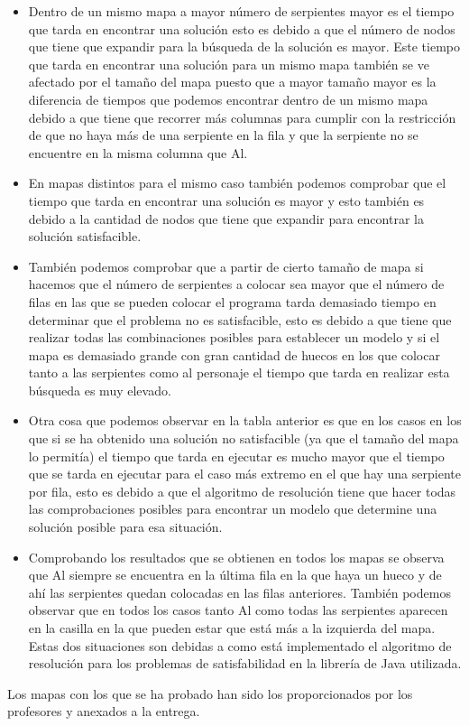 \documentclass[11pt,spanish]{article}
\begin{document}
			\begin{itemize}
				\item Dentro de un mismo mapa a mayor número de serpientes mayor es el tiempo que tarda en encontrar una solución esto es debido a que el número de nodos que tiene que expandir para la búsqueda de la solución es mayor. Este tiempo que tarda en encontrar una solución para un mismo mapa también se ve afectado por el tamaño del mapa puesto que a mayor tamaño mayor es la diferencia de tiempos que podemos encontrar dentro de un mismo mapa debido a que tiene que recorrer más columnas para cumplir con la restricción de que no haya más de una serpiente en la fila y que la serpiente no se encuentre en la misma columna que Al.
				\item En mapas distintos para el mismo caso también podemos comprobar que el tiempo que tarda en encontrar una solución es mayor y esto también es debido a la cantidad de nodos que tiene que expandir para encontrar la solución satisfacible.
				\item También podemos comprobar que a partir de cierto tamaño de mapa si hacemos que el número de serpientes a colocar sea mayor que el número de filas en las que se pueden colocar el programa tarda demasiado tiempo en determinar que el problema no es satisfacible, esto es debido a que tiene que realizar todas las combinaciones posibles para establecer un modelo y si el mapa es demasiado grande con gran cantidad de huecos en los que colocar tanto a las serpientes como al personaje el tiempo que tarda en realizar esta búsqueda es muy elevado.
				\item Otra cosa que podemos observar en la tabla anterior es que en los casos en los que si se ha obtenido una solución no satisfacible (ya que el tamaño del mapa lo permitía) el tiempo que tarda en ejecutar es mucho mayor que el tiempo que se tarda en ejecutar para el caso más extremo en el que hay una serpiente por fila, esto es debido a que el algoritmo de resolución tiene que hacer todas las comprobaciones posibles para encontrar un modelo que determine una solución posible para esa situación.
				\item Comprobando los resultados que se obtienen en todos los mapas se observa que Al siempre se encuentra en la última fila en la que haya un hueco y de ahí las serpientes quedan colocadas en las filas anteriores. También podemos observar que en todos los casos tanto Al como todas las serpientes aparecen en la casilla en la que pueden estar que está más a la izquierda del mapa. Estas dos situaciones son debidas a como está implementado el algoritmo de resolución para los problemas de satisfabilidad en la librería de Java utilizada.
			\end{itemize}
			Los mapas con los que se ha probado han sido los proporcionados por los profesores y anexados a la entrega.
\end{document}
